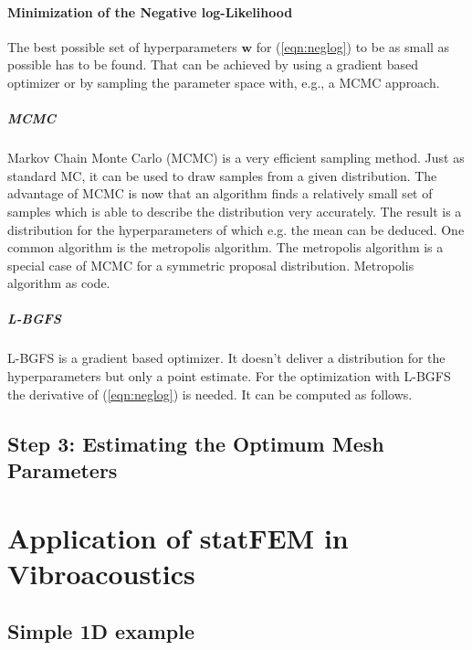 \documentclass[%
  a4paper,oneside,%
  11pt,%
  smallchapters,
  green,%
  rgb, <cmyk>
  ,]{tubsbook}
\begin{document}
\subsubsection{Minimization of the Negative log-Likelihood}
The best possible set of hyperparameters $\bm{w}$ for (\ref{eqn:neglog}) to be as small as possible has to be found. That can be achieved by using a gradient based optimizer or by sampling the parameter space with, e.g., a MCMC approach.
\paragraph{MCMC}
Markov Chain Monte Carlo (MCMC) is a very efficient sampling method. Just as standard MC, it can be used to draw samples from a given distribution. The advantage of MCMC is now that an algorithm finds a relatively small set of samples which is able to describe the distribution very accurately. The result is a distribution for the hyperparameters of which e.g. the mean can be deduced. One common algorithm is the metropolis algorithm.
The metropolis algorithm is a special case of MCMC for a symmetric proposal distribution.
Metropolis algorithm as code. 



\paragraph{L-BGFS}
L-BGFS is a gradient based optimizer. It doesn't deliver a distribution for the hyperparameters but only a point estimate.
For the optimization with L-BGFS the derivative of (\ref{eqn:neglog}) is needed. It can be computed as follows.





\section{Step 3: Estimating the Optimum Mesh Parameters}


\chapter{Application of statFEM in Vibroacoustics}

\section{Simple 1D example}
\end{document}
